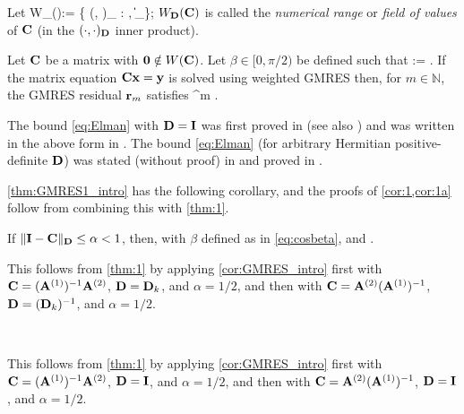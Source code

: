 Let 
\beq\label{eq:fov}
W_\Dmat(\matrixC):= \Big\{ (\matrixC \bx, \bx)_{\Dmat} : \bx \in \CCN, \|\bx\|_\Big\};
\eeq
$W_{\mathbf{D}}(\mathbf{C})$ is called the \emph{numerical range} or \emph{field of values} of $\mathbf{C}$ (in the $(\cdot,\cdot)_{\mathbf{D}}$ inner product).


\begin{theorem}\label{thm:GMRES1_intro} 
Let $\mathbf{C}$ be a matrix with $\mathbf{0}\notin W(\mathbf{C})$. Let $\beta\in[0,\pi/2)$ be defined such that
\beq\label{eq:cosbeta}
\cos \beta := .
\eeq
If the matrix equation $\mathbf{C} \mathbf{x} = \mathbf{y}$ is solved using weighted GMRES then, 
for $m\in \mathbb{N}$, the GMRES residual $\mathbf{r}_m$ %
satisfies
\beq\label{eq:Elman}
 \leq \sin^m \beta. %
\eeq
\end{theorem}
The bound \cref{eq:Elman} with $\mathbf{D}=\mathbf{I}$ was first proved in \cite[Theorem 6.3]{El:82} (see also \cite[Theorem 3.3]{EiElSc:83}) and was written in the above form in \cite[Equation 1.2]{BeGoTy:06}. The bound \cref{eq:Elman} (for arbitrary Hermitian positive-definite $\mathbf{D}$) was stated (without proof) in \cite{CaWi:92} and proved in \cite[Theorem 5.1]{GrSpVa:17}. %



\cref{thm:GMRES1_intro} has the following corollary, and the proofs of \cref{cor:1,cor:1a} follow from combining this with \cref{thm:1}.

\begin{corollary}
\label{cor:GMRES_intro} 
If $\|\mathbf{I} - \mathbf{C} \|_{\mathbf{D}} \leq \alpha < 1$, then, with $\beta$ defined as in \cref{eq:cosbeta},
\beqs
\cos \beta \geq {}\eeqs
and
\beq\label{eq:gmressin}
\sin \beta \leq {}.
\eeq
\end{corollary}

This follows from \cref{thm:1} by applying \cref{cor:GMRES_intro} first with $\mathbf{C}= (\mathbf{A}^{(1)})^{-1} \mathbf{A}^{(2)}$, $\mathbf{D}=\mathbf{D}_k$, and $\alpha=1/2$, and then with $\mathbf{C}= \mathbf{A}^{(2)}(\mathbf{A}^{(1)})^{-1} $, $\mathbf{D}=(\mathbf{D}_k)^{-1}$, and $\alpha=1/2$.
\epf

\

This follows from \cref{thm:1} by applying \cref{cor:GMRES_intro} first with $\mathbf{C}= (\mathbf{A}^{(1)})^{-1} \mathbf{A}^{(2)}$, $\mathbf{D}=\mathbf{I}$, and $\alpha=1/2$, and then with $\mathbf{C}= \mathbf{A}^{(2)}(\mathbf{A}^{(1)})^{-1} $, $\mathbf{D}=\mathbf{I}$, and $\alpha=1/2$.
\epf


